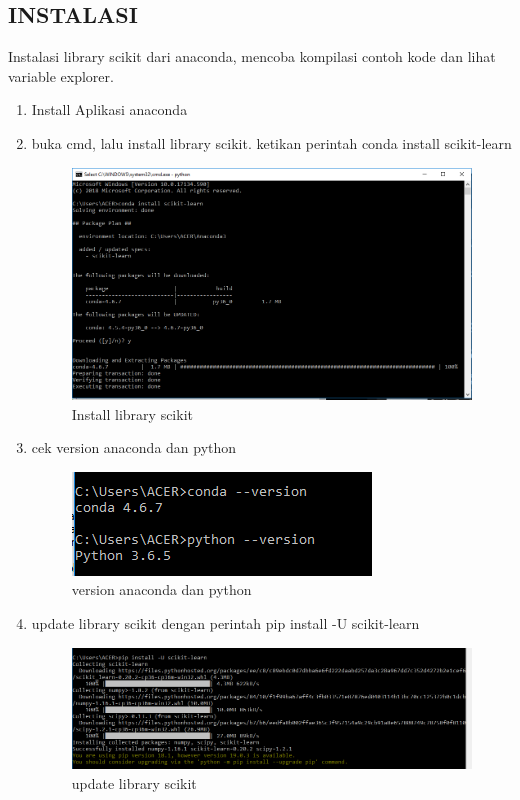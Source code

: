 \subsection{INSTALASI}
Instalasi library scikit dari anaconda, mencoba kompilasi contoh kode dan lihat variable explorer.
\begin {enumerate}
\par
\item Install Aplikasi anaconda
\item buka cmd, lalu install library scikit. ketikan perintah conda install scikit-learn 
\par
\begin{figure}[ht]
\centering
\includegraphics[scale=0.5]{figures/1.png}
\caption{Install library scikit}
\label{contoh}
\end{figure}
\par

\item cek version anaconda dan python
\par
\begin{figure}[ht]
\centering
\includegraphics[scale=0.7]{figures/2.png}
\caption{version anaconda dan python}
\label{contoh}
\end{figure}
\par

\item update library scikit dengan perintah pip install -U scikit-learn
\par
\begin{figure}[ht]
\centering
\includegraphics[scale=0.5]{figures/3.png}
\caption{update library scikit}
\label{contoh}
\end{figure}
\par


\end{enumerate}
